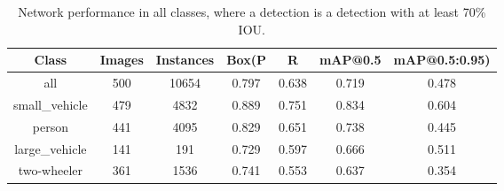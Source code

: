 \begin{table}[h!]
\centering
\begin{tabular}{|c|c|c|c|c|c|c|}
\hline
\textbf{Class} & \textbf{Images} & \textbf{Instances} & \textbf{Box(P} & \textbf{R} & \textbf{mAP@0.5} & \textbf{mAP@0.5:0.95)} \\
\hline
all            & 500             & 10654             & 0.797           & 0.638      & 0.719            & 0.478                 \\
small\_vehicle & 479             & 4832              & 0.889           & 0.751      & 0.834            & 0.604                 \\
person         & 441             & 4095              & 0.829           & 0.651      & 0.738            & 0.445                 \\
large\_vehicle & 141             & 191               & 0.729           & 0.597      & 0.666            & 0.511                 \\
two-wheeler    & 361             & 1536              & 0.741           & 0.553      & 0.637            & 0.354                 \\
\hline
\end{tabular}
\caption{Network performance in all classes, where a detection is a detection with at least 70\% IOU.}
\label{table:performance_metrics}
\end{table}




